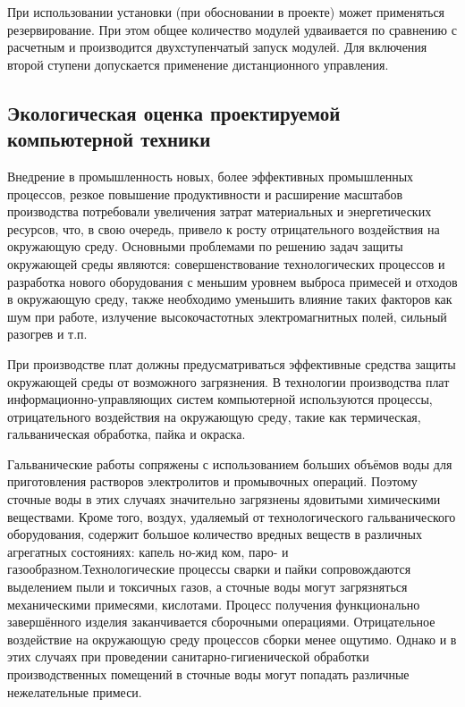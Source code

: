 При использовании установки (при обосновании в проекте) может применяться резервирование. При этом общее количество модулей
удваивается по сравнению с расчетным и производится двухступенчатый запуск модулей. Для включения второй ступени допускается
применение дистанционного управления.

\subsection{Экологическая оценка проектируемой компьютерной техники}
Внедрение в промышленность новых, более эффективных промышленных процессов, резкое повышение продуктивности и расширение
масштабов производства потребовали увеличения затрат материальных и энергетических ресурсов, что, в свою очередь,
привело к росту отрицательного воздействия на окружающую среду. Основными проблемами по решению задач защиты окружающей
среды являются: совершенствование технологических процессов и разработка нового оборудования с меньшим уровнем выброса
примесей и отходов в окружающую среду, также необходимо уменьшить влияние таких факторов как шум при работе, излучение
высокочастотных электромагнитных полей, сильный разогрев и т.п.

При производстве плат должны предусматриваться эффективные средства
защиты окружающей среды от возможного загрязнения. В технологии производства плат информационно-управляющих систем
компьютерной используются процессы, отрицательного воздействия на окружающую среду, такие как термическая,
гальваническая обработка, пайка и окраска.

Гальванические работы сопряжены с использованием больших объёмов воды для приготовления растворов электролитов и
промывочных операций. Поэтому сточные воды в этих случаях значительно загрязнены ядовитыми химическими веществами.
Кроме того, воздух, удаляемый от технологического гальванического оборудования, содержит большое количество вредных
веществ в различных агрегатных состояниях: капель но-жид ком, паро- и газообразном.Технологические процессы сварки и
пайки сопровождаются выделением пыли и токсичных газов, а сточные воды могут загрязняться механическими примесями,
кислотами. Процесс получения функционально завершённого изделия заканчивается сборочными операциями. Отрицательное
воздействие на окружающую среду процессов сборки менее ощутимо. Однако и в этих случаях при проведении
санитарно-гигиенической обработки производственных помещений в сточные воды могут попадать различные нежелательные примеси.

